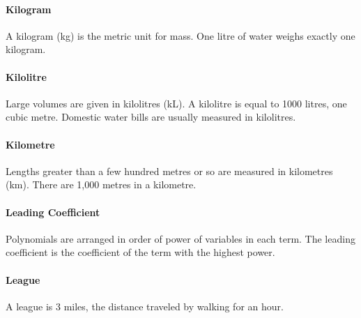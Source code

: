 \documentclass[12pt]{article}
\begin{document}
\paragraph{Kilogram}
A kilogram (kg) is the metric unit for mass. One litre of water weighs exactly one kilogram.

\paragraph{Kilolitre} Large volumes are given in kilolitres (kL). A kilolitre is equal to 1000 litres, one cubic metre. Domestic water bills are usually measured in kilolitres.


\begin{center}
\end{center}

\paragraph{Kilometre} Lengths greater than a few hundred metres or so are measured in kilometres (km). There are 1,000 metres in a kilometre.


\paragraph{Leading Coefficient}
Polynomials are arranged in order of power of variables in each term. The leading coefficient is the coefficient of the term with the highest power.

\paragraph{League}
A league is 3 miles, the distance traveled by walking for an hour.
\end{document}
